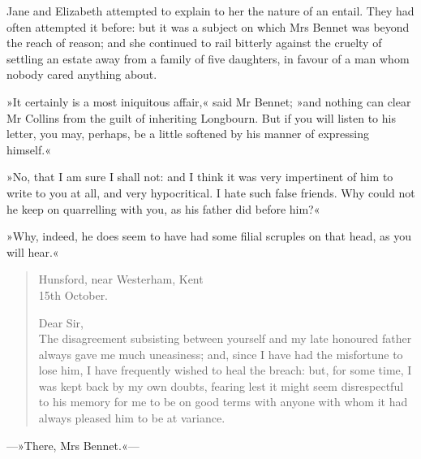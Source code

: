Jane and Elizabeth attempted to explain to her the nature of an entail. They had often attempted it before: but it was a subject on which Mrs Bennet was beyond the reach of reason; and she continued to rail bitterly against the cruelty of settling an estate away from a family of five daughters, in favour of a man whom nobody cared anything about.

»It certainly is a most iniquitous affair,« said Mr Bennet; »and nothing can clear Mr Collins from the guilt of inheriting Longbourn. But if you will listen to his letter, you may, perhaps, be a little softened by his manner of expressing himself.«

»No, that I am sure I shall not: and I think it was very impertinent of him to write to you at all, and very hypocritical. I hate such false friends. Why could not he keep on quarrelling with you, as his father did before him?«

»Why, indeed, he does seem to have had some filial scruples on that head, as you will hear.«

\begin{quotation}
\begin{flushright}
Hunsford, near Westerham, Kent\\ 15th October.
\end{flushright}

\noindent Dear Sir,\\

\indent The disagreement subsisting between yourself and my late honoured father always gave me much uneasiness; and, since I have had the misfortune to lose him, I have frequently wished to heal the breach: but, for some time, I was kept back by my own doubts, fearing lest it might seem disrespectful to his memory for me to be on good terms with anyone with whom it had always pleased him to be at variance.\\
\end{quotation}

—»There, Mrs Bennet.«—

